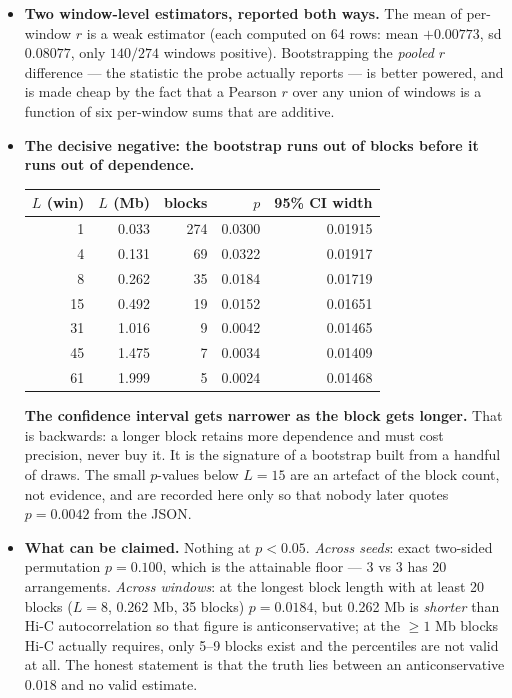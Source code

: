 \documentclass[11pt,a4paper]{article}
\begin{document}
\begin{itemize}
\item \textbf{Two window-level estimators, reported both ways.} The mean of
per-window $r$ is a weak estimator (each computed on 64 rows: mean $+0.00773$,
sd $0.08077$, only $140/274$ windows positive). Bootstrapping the
\emph{pooled} $r$ difference --- the statistic the probe actually reports ---
is better powered, and is made cheap by the fact that a Pearson $r$ over any
union of windows is a function of six per-window sums that are additive.

\item \textbf{The decisive negative: the bootstrap runs out of blocks before
it runs out of dependence.}

\begin{center}
\begin{tabular}{rrrrr}
\toprule
$L$ (win) & $L$ (Mb) & blocks & $p$ & 95\% CI width \\
\midrule
1  & 0.033 & 274 & 0.0300 & 0.01915 \\
4  & 0.131 &  69 & 0.0322 & 0.01917 \\
8  & 0.262 &  35 & 0.0184 & 0.01719 \\
15 & 0.492 &  19 & 0.0152 & 0.01651 \\
31 & 1.016 &   9 & 0.0042 & 0.01465 \\
45 & 1.475 &   7 & 0.0034 & 0.01409 \\
61 & 1.999 &   5 & 0.0024 & 0.01468 \\
\bottomrule
\end{tabular}
\end{center}

\textbf{The confidence interval gets narrower as the block gets longer.} That
is backwards: a longer block retains more dependence and must cost precision,
never buy it. It is the signature of a bootstrap built from a handful of draws.
The small $p$-values below $L=15$ are an artefact of the block count, not
evidence, and are recorded here only so that nobody later quotes
$p = 0.0042$ from the JSON.

\item \textbf{What can be claimed.} Nothing at $p<0.05$.
\emph{Across seeds}: exact two-sided permutation $p = 0.100$, which is the
attainable floor --- $3$ vs $3$ has 20 arrangements. \emph{Across windows}: at
the longest block length with at least 20 blocks ($L=8$, 0.262 Mb, 35 blocks)
$p = 0.0184$, but 0.262 Mb is \emph{shorter} than Hi-C autocorrelation so that
figure is anticonservative; at the $\geq 1$ Mb blocks Hi-C actually requires,
only 5--9 blocks exist and the percentiles are not valid at all. The honest
statement is that the truth lies between an anticonservative $0.018$ and no
valid estimate.


\end{itemize}
\end{document}
